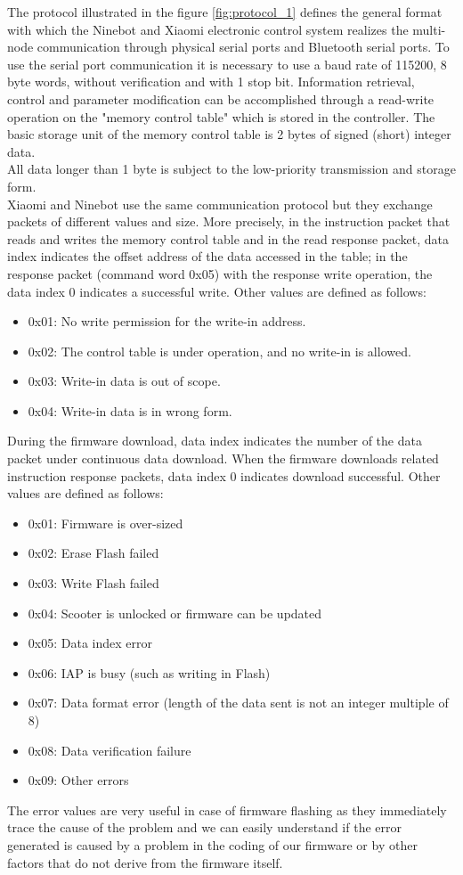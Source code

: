 \documentclass[binding=0.6cm,LaM,noexaminfo]{sapthesis}
\begin{document}
\noindent 
The protocol illustrated in the figure \ref{fig:protocol_1} defines the general format with which the Ninebot and Xiaomi electronic control system realizes the multi-node communication through physical serial ports and Bluetooth serial ports. To use the serial port communication it is necessary to use a baud rate of 115200, 8 byte words, without verification and with 1 stop bit. Information retrieval, control and parameter modification can be accomplished through a read-write operation on the "memory control table" which is stored in the controller. The basic storage unit of the memory control table is 2 bytes of signed (short) integer data.\\
All data longer than 1 byte is subject to the low-priority transmission and storage form.\\
Xiaomi and Ninebot use the same communication protocol but they exchange packets of different values and size. More precisely, in the instruction packet that reads and writes the memory control table and in the read response packet, data index indicates the offset address of the data accessed in the table; in the response packet (command word 0x05) with the response write operation, the data index 0 indicates a successful write. Other values are defined as follows:
\begin{itemize}[noitemsep, topsep=1pt]
    \item 0x01: No write permission for the write-in address.
    \item 0x02: The control table is under operation, and no write-in is allowed.
    \item 0x03: Write-in data is out of scope.
    \item 0x04: Write-in data is in wrong form.
\end{itemize}

\noindent During the firmware download, data index indicates the number of the data packet under continuous data download. When the firmware downloads related instruction response packets, data index 0 indicates download successful. Other values are defined as follows:
\begin{itemize}[noitemsep, topsep=1pt]
    \item 0x01: Firmware is over-sized
    \item 0x02: Erase Flash failed
    \item 0x03: Write Flash failed
    \item 0x04: Scooter is unlocked or firmware can be updated
    \item 0x05: Data index error
    \item 0x06: IAP is busy (such as writing in Flash)
    \item 0x07: Data format error (length of the data sent is not an integer multiple of 8)
    \item 0x08: Data verification failure
    \item 0x09: Other errors
\end{itemize}
The error values are very useful in case of firmware flashing as they immediately trace the cause of the problem and we can easily understand if the error generated is caused by a problem in the coding of our firmware or by other factors that do not derive from the firmware itself.
\end{document}
